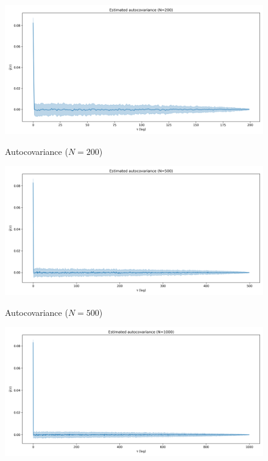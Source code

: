 \documentclass[11pt]{article}
\begin{document}
\begin{exercise}
\begin{figure}
    \centering
    \begin{minipage}[t]{0.3\textwidth}
    \centerline{\includegraphics[width=\textwidth]{figures/gamma_N200.png}}
    \centerline{Autocovariance ($N=200$)}
    \end{minipage}
    \begin{minipage}[t]{0.3\textwidth}
    \centerline{\includegraphics[width=\textwidth]{figures/gamma_N500.png}}
    \centerline{Autocovariance ($N=500$)}
    \end{minipage}
    \begin{minipage}[t]{0.3\textwidth}
    \centerline{\includegraphics[width=\textwidth]{figures/gamma_N1000.png}}

\end{minipage}
\end{figure}
\end{exercise}
\end{document}
